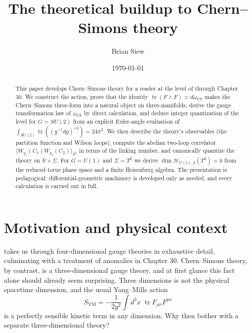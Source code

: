 \documentclass[11pt]{article}
\title{The theoretical buildup to Chern--Simons theory}
\author{Brian Siew}
\date{\today}
\newcommand{\R}{\mathbb{R}}
\newcommand{\tr}{\operatorname{tr}}
\newcommand{\CS}{\operatorname{CS}}
\theoremstyle{definition}
\numberwithin{theorem}{section}
\numberwithin{equation}{section}
\begin{document}
\maketitle

\begin{abstract}
This paper develops Chern--Simons theory for a reader at the level of \cite{Schwartz2014QFT} through Chapter 30. We construct the action, prove that the identity $\tr(F\wedge F) = d\omega_{\CS}$ makes the Chern--Simons three-form into a natural object on three-manifolds, derive the gauge transformation law of $\omega_{\CS}$ by direct calculation, and deduce integer quantization of the level for $G=SU(2)$ from an explicit Euler-angle evaluation of $\int_{SU(2)}\tr((g^{-1}dg)^{\wedge 3}) = 24\pi^2$. We then describe the theory's observables (the partition function and Wilson loops), compute the abelian two-loop correlator $\langle W_{q_1}(C_1)W_{q_2}(C_2)\rangle_{S^3}$ in terms of the linking number, and canonically quantize the theory on $\R\times \Sigma$. For $G=U(1)$ and $\Sigma = T^2$ we derive $\dim \mathcal{H}_{U(1),k}(T^2) = k$ from the reduced torus phase space and a finite Heisenberg algebra. The presentation is pedagogical: differential-geometric machinery is developed only as needed, and every calculation is carried out in full.
\end{abstract}

\tableofcontents
\newpage

\section{Motivation and physical context}\label{sec:motivation}

\cite{Schwartz2014QFT} takes us through four-dimensional gauge theories in exhaustive detail, culminating with a treatment of anomalies in Chapter 30. Chern--Simons theory, by contrast, is a three-dimensional gauge theory, and at first glance this fact alone should already seem surprising. Three dimensions is not the physical spacetime dimension, and the usual Yang--Mills action
\begin{equation}\label{eq:YM-action}
S_{\text{YM}} = -\frac{1}{2g^2}\int d^3x\; \tr F_{\mu\nu}F^{\mu\nu}
\end{equation}
is a perfectly sensible kinetic term in any dimension. Why then bother with a separate three-dimensional theory?

\medskip
\end{document}
